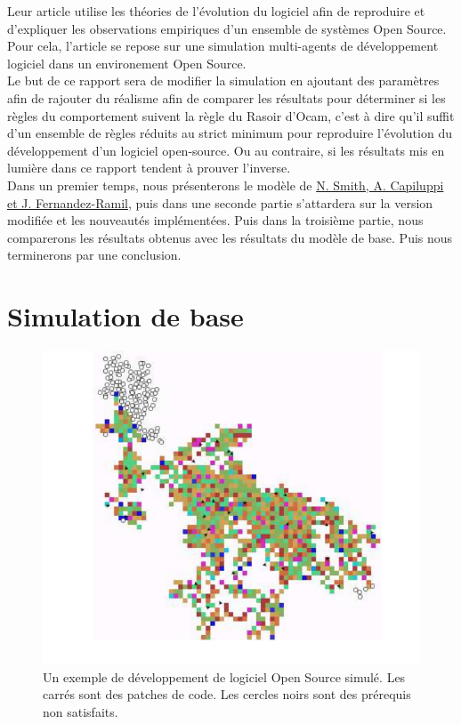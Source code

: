 \documentclass{article}
\begin{document}
Leur article utilise les théories de l'évolution du logiciel
afin de reproduire et d'expliquer les observations empiriques d'un ensemble
de systèmes Open Source. Pour cela, l'article se repose sur une
simulation multi-agents de développement logiciel dans un environement Open Source.
\\

Le but de ce rapport sera de modifier la simulation en ajoutant des
paramètres afin de rajouter du réalisme afin de comparer les résultats pour
déterminer si les règles du comportement suivent la règle du Rasoir d'Ocam, c'est à dire
qu'il suffit d'un ensemble de règles réduits au strict minimum pour reproduire l'évolution du
développement d'un logiciel open-source. Ou au contraire, si les résultats mis en lumière dans
ce rapport tendent à prouver l'inverse.
\\

Dans un premier temps, nous présenterons le modèle de \href{http://oro.open.ac.uk/4698/1/}{N. Smith, A. Capiluppi et J. Fernandez-Ramil},
puis dans une seconde partie s'attardera sur la version modifiée et les nouveautés implémentées. Puis
dans la troisième partie, nous comparerons les résultats obtenus avec les résultats du modèle de base.
Puis nous terminerons par une conclusion.

\newpage

\section{Simulation de base}

\begin{figure}[H]
 \centerline{\includegraphics[scale=0.45]{pictures/Image0.png}}
\caption{Un exemple de développement de logiciel Open Source
  simulé. Les carrés sont des patches de code. Les cercles noirs
  sont des prérequis non satisfaits.}
 \end{figure}
\end{document}
